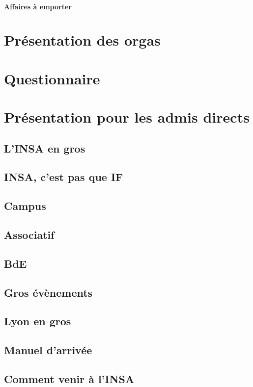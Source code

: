 \begin{multicols}{2}
	\paragraph{Affaires à emporter}
	
\newpage
\section{Présentation des orgas}

\newpage
\section{Questionnaire}

\newpage
\section{Présentation pour les admis directs}
    \subsection{L'INSA en gros}
    
    \subsection{INSA, c'est pas que IF}
    
    \subsection{Campus}
    
    \subsection{Associatif}
    
    \subsection{BdE}
    
    \subsection{Gros évènements}
    
    \subsection{Lyon en gros}
    
    \subsection{Manuel d'arrivée}
    \subsection{Comment venir à l'INSA}
    

\end{multicols}
